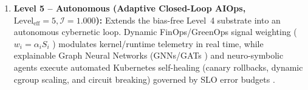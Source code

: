 \begin{enumerate}
    \item \textbf{Level 5 -- Autonomous (Adaptive Closed-Loop AIOps, $\text{Level}_{\text{eff}} = 5, \mathcal{I} = 1.000$):} Extends the bias-free Level~4 substrate into an autonomous cybernetic loop. Dynamic FinOps/GreenOps signal weighting ($w_i = \alpha_i S_i$ \cite{amgothu_2025}) modulates kernel/runtime telemetry in real time, while explainable Graph Neural Networks (GNNs/GATs \cite{han_2024}) and neuro-symbolic agents execute automated Kubernetes self-healing (canary rollbacks, dynamic cgroup scaling, and circuit breaking) governed by SLO error budgets \cite{deng_2024, gomes_2025}.
\end{enumerate}
